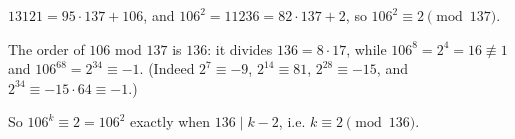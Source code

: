 $13121=95\cdot137+106$, and $106^2=11236=82\cdot137+2$, so $106^2\equiv2\pmod{137}$.

The order of $106$ mod $137$ is $136$: it divides $136=8\cdot17$, while $106^{8}=2^4=16\not\equiv1$ and $106^{68}=2^{34}\equiv-1$. (Indeed $2^7\equiv-9$, $2^{14}\equiv81$, $2^{28}\equiv-15$, and $2^{34}\equiv-15\cdot64\equiv-1$.)

So $106^k\equiv2=106^2$ exactly when $136\mid k-2$, i.e. $\boxed{k\equiv2\pmod{136}}$.
